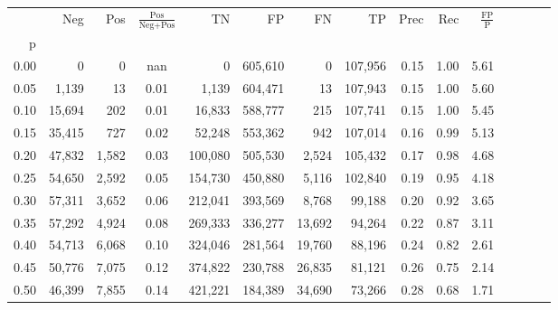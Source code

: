 \begin{tabular}{rrrcrrrrrrrrrrr}
\toprule
{} &     Neg &    Pos & $\frac{\text{Pos}}{\text{Neg}+\text{Pos}}$ &       TN &       FP &       FN &       TP &  Prec &   Rec & $\frac{\text{FP}}{\text{P}}$ \\
p    &         &        &                                            &          &          &          &          &       &       &                              \\
\midrule
0.00 &       0 &      0 &                                        nan &        0 &  605,610 &        0 &  107,956 &  0.15 &  1.00 &                         5.61 \\
0.05 &   1,139 &     13 &                                       0.01 &    1,139 &  604,471 &       13 &  107,943 &  0.15 &  1.00 &                         5.60 \\
0.10 &  15,694 &    202 &                                       0.01 &   16,833 &  588,777 &      215 &  107,741 &  0.15 &  1.00 &                         5.45 \\
0.15 &  35,415 &    727 &                                       0.02 &   52,248 &  553,362 &      942 &  107,014 &  0.16 &  0.99 &                         5.13 \\
0.20 &  47,832 &  1,582 &                                       0.03 &  100,080 &  505,530 &    2,524 &  105,432 &  0.17 &  0.98 &                         4.68 \\
0.25 &  54,650 &  2,592 &                                       0.05 &  154,730 &  450,880 &    5,116 &  102,840 &  0.19 &  0.95 &                         4.18 \\
0.30 &  57,311 &  3,652 &                                       0.06 &  212,041 &  393,569 &    8,768 &   99,188 &  0.20 &  0.92 &                         3.65 \\
0.35 &  57,292 &  4,924 &                                       0.08 &  269,333 &  336,277 &   13,692 &   94,264 &  0.22 &  0.87 &                         3.11 \\
0.40 &  54,713 &  6,068 &                                       0.10 &  324,046 &  281,564 &   19,760 &   88,196 &  0.24 &  0.82 &                         2.61 \\
0.45 &  50,776 &  7,075 &                                       0.12 &  374,822 &  230,788 &   26,835 &   81,121 &  0.26 &  0.75 &                         2.14 \\
0.50 &  46,399 &  7,855 &                                       0.14 &  421,221 &  184,389 &   34,690 &   73,266 &  0.28 &  0.68 &                         1.71 \\

\end{tabular}
